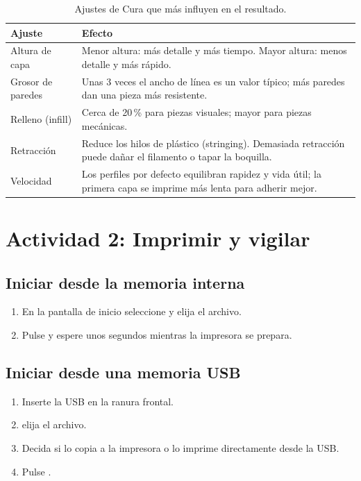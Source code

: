 \begin{table}[H]
    \centering
    \caption{Ajustes de Cura que más influyen en el resultado.}
    \label{tab:cura}
    \small
    \begin{tabularx}{\linewidth}{l X}
        \toprule
        \textbf{Ajuste} & \textbf{Efecto} \\
        \midrule
        Altura de capa & Menor altura: más detalle y más tiempo. Mayor altura: menos detalle y más rápido. \\
        Grosor de paredes & Unas 3 veces el ancho de línea es un valor típico; más paredes dan una pieza más resistente. \\
        Relleno (infill) & Cerca de 20\,\% para piezas visuales; mayor para piezas mecánicas. \\
        Retracción & Reduce los hilos de plástico (stringing). Demasiada retracción puede dañar el filamento o tapar la boquilla. \\
        Velocidad & Los perfiles por defecto equilibran rapidez y vida útil; la primera capa se imprime más lenta para adherir mejor. \\
        \bottomrule
    \end{tabularx}
\end{table}

\newpage
\section{Actividad 2: Imprimir y vigilar}

\subsection*{Iniciar desde la memoria interna}

\begin{enumerate}
    \item En la pantalla de inicio seleccione  y elija el archivo.
    \item Pulse  y espere unos segundos mientras la impresora se prepara.
\end{enumerate}

\subsection*{Iniciar desde una memoria USB}

\begin{enumerate}
    \item Inserte la USB en la ranura frontal.
    \item {}\flecha elija el archivo.
    \item Decida si lo copia a la impresora o lo imprime directamente desde la USB.
    \item Pulse .
\end{enumerate}

